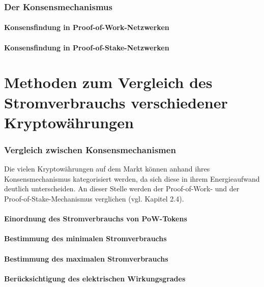 \documentclass[12pt]{article}
\begin{document}
\section{Der Konsensmechanismus}


\subsection{Konsensfindung in Proof-of-Work-Netzwerken}


\subsection{Konsensfindung in Proof-of-Stake-Netzwerken}


\part{Methoden zum Vergleich des Stromverbrauchs verschiedener Kryptowährungen}

\section{Vergleich zwischen Konsensmechanismen}
Die vielen Kryptowährungen auf dem Markt können anhand ihres Konsensmechanismus kategorisiert werden, da sich diese in ihrem Energieaufwand deutlich unterscheiden. An dieser Stelle werden der Proof-of-Work- und der Proof-of-Stake-Mechanismus verglichen (vgl. Kapitel 2.4).
\subsection{Einordnung des Stromverbrauchs von PoW-Tokens}

\subsection{Bestimmung des minimalen Stromverbrauchs}


\subsection{Bestimmung des maximalen Stromverbrauchs}


\subsection{Berücksichtigung des elektrischen Wirkungsgrades}

\end{document}

